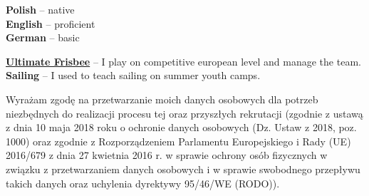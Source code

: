 \documentclass[10pt]{developercv} %
\begin{document}

\begin{minipage}[t]{0.23\textwidth}
	\vspace{-\baselineskip} %

	
	\textbf{Polish} -- native\\
	\textbf{English} -- proficient\\
	\textbf{German} -- basic
\end{minipage}
\begin{minipage}[t]{0.75\textwidth}
	\vspace{-\baselineskip} %
	
	
	\textbf{\href{https://www.facebook.com/AKSZlyKosmodysk}{Ultimate Frisbee}} -- I play on competitive european level and manage the team.\\
	\textbf{Sailing} -- I used to teach sailing on summer youth camps.
\end{minipage}
\hfill

\vspace{\fill}
\footnotesize{Wyrażam zgodę na przetwarzanie moich danych osobowych dla potrzeb niezbędnych do realizacji procesu tej oraz przyszłych rekrutacji (zgodnie z ustawą z dnia 10 maja 2018 roku o ochronie danych osobowych (Dz. Ustaw z 2018, poz. 1000) oraz zgodnie z Rozporządzeniem Parlamentu Europejskiego i Rady (UE) 2016/679 z dnia 27 kwietnia 2016 r. w sprawie ochrony osób fizycznych w związku z przetwarzaniem danych osobowych i w sprawie swobodnego przepływu takich danych oraz uchylenia dyrektywy 95/46/WE (RODO)).}
\end{document}
